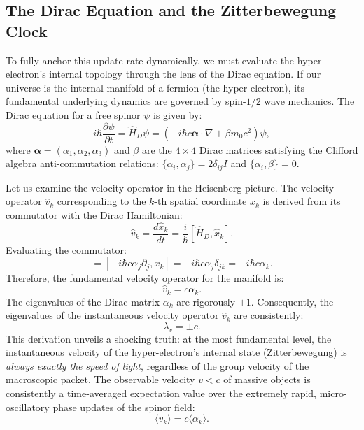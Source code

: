 \subsection{The Dirac Equation and the Zitterbewegung Clock}
To fully anchor this update rate dynamically, we must evaluate the hyper-electron's internal topology through the lens of the Dirac equation. If our universe is the internal manifold of a fermion (the hyper-electron), its fundamental underlying dynamics are governed by spin-$1/2$ wave mechanics. The Dirac equation for a free spinor $\psi$ is given by:
\begin{equation}
    i\hbar \frac{\partial \psi}{\partial t} = \hat{H}_D \psi = \left( -i\hbar c \boldsymbol{\alpha} \cdot \nabla + \beta m_0 c^2 \right) \psi,
\end{equation}
where $\boldsymbol{\alpha} = (\alpha_1, \alpha_2, \alpha_3)$ and $\beta$ are the $4 \times 4$ Dirac matrices satisfying the Clifford algebra anti-commutation relations: $\{\alpha_i, \alpha_j\} = 2\delta_{ij}I$ and $\{\alpha_i, \beta\} = 0$.

Let us examine the velocity operator in the Heisenberg picture. The velocity operator $\hat{v}_k$ corresponding to the $k$-th spatial coordinate $x_k$ is derived from its commutator with the Dirac Hamiltonian:
\begin{equation}
    \hat{v}_k = \frac{d\hat{x}_k}{dt} = \frac{i}{\hbar} [\hat{H}_D, \hat{x}_k].
\end{equation}
Evaluating the commutator:
\begin{equation}
    [\hat{H}_D, \hat{x}_k] = [-i\hbar c \alpha_j \partial_j, x_k] = -i\hbar c \alpha_j \delta_{jk} = -i\hbar c \alpha_k.
\end{equation}
Therefore, the fundamental velocity operator for the manifold is:
\begin{equation}
    \hat{v}_k = c \alpha_k.
\end{equation}
The eigenvalues of the Dirac matrix $\alpha_k$ are rigorously $\pm 1$. Consequently, the eigenvalues of the instantaneous velocity operator $\hat{v}_k$ are consistently:
\begin{equation}
    \lambda_v = \pm c.
\end{equation}
This derivation unveils a shocking truth: at the most fundamental level, the instantaneous velocity of the hyper-electron's internal state (Zitterbewegung) is \textit{always exactly the speed of light}, regardless of the group velocity of the macroscopic packet. The observable velocity $v < c$ of massive objects is consistently a time-averaged expectation value over the extremely rapid, micro-oscillatory phase updates of the spinor field:
\begin{equation}
    \langle v_k \rangle = c \langle \alpha_k \rangle.
\end{equation}

